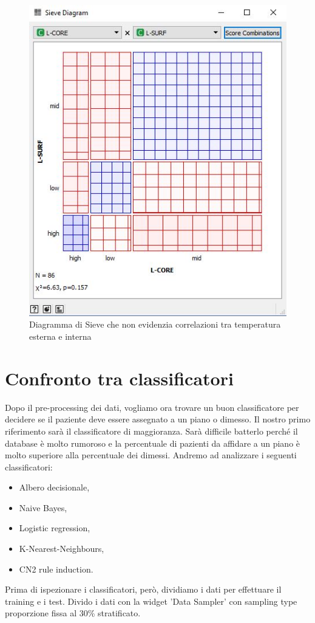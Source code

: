 \documentclass[a4paper, 12p]{report}
\begin{document}
\begin{figure}	
	\centering
	\includegraphics[scale = 0.6]{img/Sieve.JPG}
	\caption{Diagramma di Sieve che non evidenzia correlazioni tra temperatura esterna e interna }\label{fig:5}
\end{figure}
\chapter{Confronto tra classificatori}
Dopo il pre-processing dei dati, vogliamo ora trovare un buon classificatore per decidere se il paziente deve essere assegnato a un piano o dimesso. Il nostro primo riferimento sarà il classificatore di maggioranza. Sarà difficile batterlo perché il database è molto rumoroso e la percentuale di pazienti da affidare a un piano è molto superiore alla percentuale dei dimessi.
Andremo ad analizzare i seguenti classificatori:
\begin{itemize}
	\item Albero decisionale,
	\item Naive Bayes,
	\item Logistic regression,
	\item K-Nearest-Neighbours,
	\item CN2 rule induction.
\end{itemize}		
	Prima di ispezionare i classificatori, però, dividiamo i dati per effettuare il training e i test. Divido i dati con la widget 'Data Sampler' con sampling type proporzione fissa al 30\% stratificato. 
	
\end{document}
